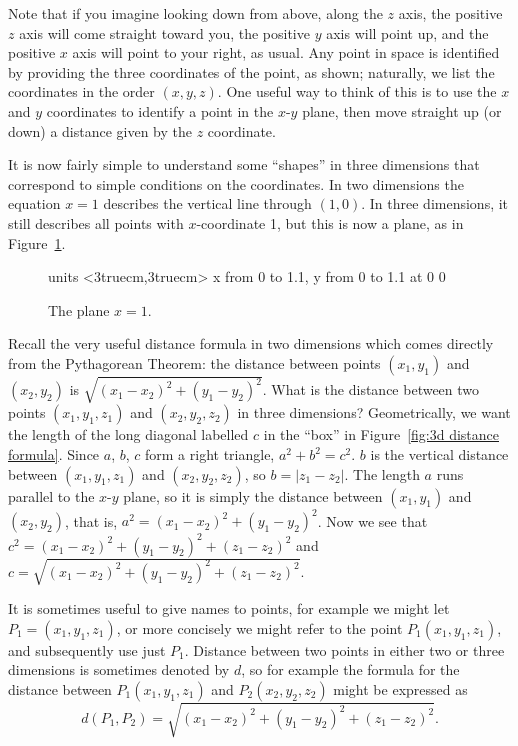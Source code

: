 Note that if you imagine looking down from above, along the $z$ axis,
the positive $z$ axis will come straight toward you, the positive $y$
axis will point up, and the positive $x$ axis will point to your
right, as usual. Any point in space is identified by providing the
three coordinates of the point, as shown; naturally, we list the
coordinates in the order $(x,y,z)$. One useful way to think of
this is to use the $x$ and $y$ coordinates to identify a point in the
$x$-$y$ plane, then move straight up (or down) a distance given by
the $z$ coordinate.

It is now fairly simple to understand some ``shapes'' in three
dimensions that correspond to simple conditions on the coordinates. In
two dimensions the equation $x=1$ describes the vertical line through
$(1,0)$. In three dimensions, it still describes all points with
$x$-coordinate 1, but this is now a plane, as in
Figure~\ref{fig:plane}.

\begin{figure}[H]
\centerline{
\vbox{\beginpicture
\normalgraphs
\setcoordinatesystem units <3truecm,3truecm>
\setplotarea x from 0 to 1.1, y from 0 to 1.1
 at 0 0
\endpicture}}
\caption{The plane $x=1$. \label{fig:plane}}
\end{figure}

Recall the very useful distance formula in two dimensions which comes directly from the Pythagorean Theorem: the
distance between points $(x_1,y_1)$ and $(x_2,y_2)$ is
$\sqrt{(x_1-x_2)^2+(y_1-y_2)^2}$. What is the distance between two points
$(x_1,y_1,z_1)$ and $(x_2,y_2,z_2)$ in three dimensions?
Geometrically, we want the length of the long diagonal labelled $c$ in
the ``box'' in Figure~\ref{fig:3d distance formula}. Since $a$,
$b$, $c$ form a right triangle, $a^2+b^2=c^2$. $b$ is the vertical
distance between $(x_1,y_1,z_1)$ and $(x_2,y_2,z_2)$, so
$b=|z_1-z_2|$.  The length $a$ runs parallel to the $x$-$y$ plane, so
it is simply the distance between $(x_1,y_1)$ and $(x_2,y_2)$, that
is, $a^2=(x_1-x_2)^2+(y_1-y_2)^2$. Now we see that
$c^2=(x_1-x_2)^2+(y_1-y_2)^2+(z_1-z_2)^2$ and
$c=\sqrt{(x_1-x_2)^2+(y_1-y_2)^2+(z_1-z_2)^2}$. 

It is sometimes useful to give names to points, for example we might
let $P_1=(x_1,y_1,z_1)$, or more concisely we might refer to the point
$P_1(x_1,y_1,z_1)$, and subsequently use just $P_1$. Distance between
two points in either two or three dimensions is sometimes denoted by
$d$, so for example the formula for the distance between $P_1(x_1,y_1,z_1)$
and $P_2(x_2,y_2,z_2)$ might be expressed as
$$d(P_1,P_2)=\sqrt{(x_1-x_2)^2+(y_1-y_2)^2+(z_1-z_2)^2}.$$

